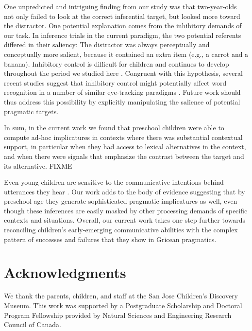 \documentclass[10pt,letterpaper]{article}
\begin{document}
One unpredicted and intriguing finding from our study was that two-year-olds not only failed to look at the correct inferential target, but looked more toward the distractor. One potential explanation comes from the inhibitory demands of our task. In inference trials in the current paradigm, the two potential referents differed in their saliency: The distractor was always perceptually and conceptually more salient, because it contained an extra item (e.g., a carrot and a banana). Inhibitory control is difficult for children and continues to develop throughout the period we studied here \cite{davidson2006development, gerardi2000sensitivity}. Congruent with this hypothesis, several recent studies suggest that inhibitory control might potentially affect word recognition in a number of similar eye-tracking paradigms \cite{yurovskybeyond,nordmeyer2013measuring}. Future work should thus address this possibility by explicitly manipulating the salience of potential pragmatic targets.

In sum, in the current work we found that preschool children were able to compute ad-hoc implicatures in contexts where there was substantial contextual support, in particular when they had access to lexical alternatives in the context, and when there were signals that emphasize the contrast between the target and its alternative. FIXME %

Even young children are sensitive to the communicative intentions behind utterances they hear \cite{clark2009first,baldwin1993early}. Our work adds to the body of evidence suggesting that by preschool age they generate sophisticated pragmatic implicatures as well, even though these inferences are easily masked by other processing demands of specific contexts and situations. Overall, our current work takes one step further towards reconciling children's early-emerging communicative abilities with the complex pattern of successes and failures that they show in Gricean pragmatics.

\section{Acknowledgments}

We thank the parents, children, and staff at the San Jose Children's Discovery Museum. This work was supported by a Postgraduate Scholarship and Doctoral Program Fellowship provided by Natural Sciences and Engineering Research Council of Canada.



\setlength{\bibleftmargin}{.125in}
\setlength{\bibindent}{-\bibleftmargin}


\end{document}
